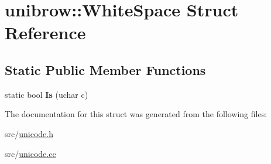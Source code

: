 \hypertarget{structunibrow_1_1_white_space}{}\section{unibrow\+:\+:White\+Space Struct Reference}
\label{structunibrow_1_1_white_space}
\subsection*{Static Public Member Functions}
\begin{DoxyCompactItemize}
\item 
\hypertarget{structunibrow_1_1_white_space_a1bb2745e2cd1b5d6d59c5527a70f55b5}{}static bool {\bfseries Is} (uchar c)\label{structunibrow_1_1_white_space_a1bb2745e2cd1b5d6d59c5527a70f55b5}

\end{DoxyCompactItemize}


The documentation for this struct was generated from the following files\+:\begin{DoxyCompactItemize}
\item 
src/\hyperlink{unicode_8h}{unicode.\+h}\item 
src/\hyperlink{unicode_8cc}{unicode.\+cc}\end{DoxyCompactItemize}
